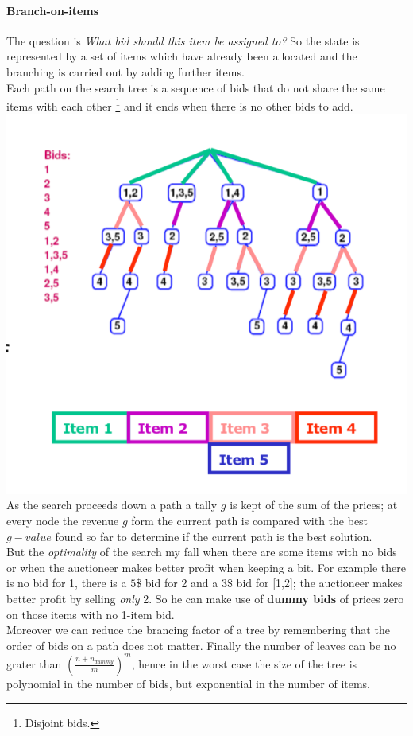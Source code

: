\documentclass[10pt,a4paper]{article}
\begin{document}
\paragraph{Branch-on-items}
The question is \textit{What bid should this item be assigned to?}
So the state is represented by a set of items which have already been allocated and the branching is carried out by adding further items.\\
Each path on the search tree is a sequence of bids that do not share the same items with each other \footnote{Disjoint bids.} and it ends when there is no other bids to add.\\
\includegraphics[scale=0.6]{images/branch_on_items.png}\\
As the search proceeds down a path a tally $g$ is kept of the sum of the prices; at every node the revenue $g$ form the current path is compared with the best $g-value$ found so far to determine if the current path is the best solution.\\
But the \textit{optimality} of the search my fall when there are some items with no bids or when the auctioneer makes better profit when keeping a bit. For example there is no bid for 1, there is a $5\$$ bid for 2 and a $3\$$ bid for [1,2]; the auctioneer makes better profit by selling \textit{only} 2. So he can make use of \textbf{dummy bids} of prices zero on those items with no 1-item bid.\\
Moreover we can reduce the brancing factor of a tree by remembering that the order of bids on a path does not matter. Finally the number of leaves can be no grater than $(\frac{n+n_{dummy}}{m})^m$, hence in the worst case the size of the tree is polynomial in the number of bids, but exponential in the number of items.
\end{document}
